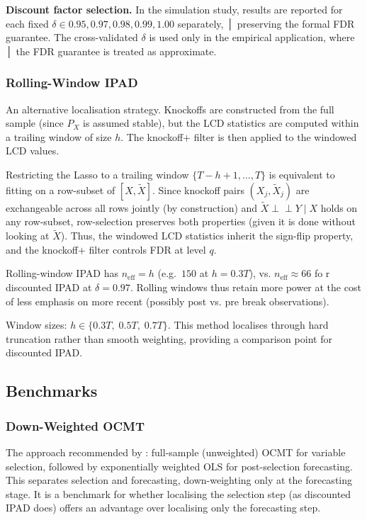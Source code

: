 \documentclass[12pt, a4paper]{article}
\begin{document}
\textbf{Discount factor selection.}  In the simulation study, results are reported for each fixed $\delta \in {0.95, 0.97, 0.98, 0.99, 1.00}$ separately,
 │ preserving the formal FDR guarantee. The cross-validated $\delta$ is used only in the empirical application, where
 │ the FDR guarantee is treated as approximate. 

 \subsubsection{Rolling-Window IPAD}
 
An alternative localisation strategy. Knockoffs are constructed from the full sample (since $P_X$ is assumed stable), but the LCD statistics are computed within a trailing window of size $h$. The knockoff$+$ filter is then applied to the windowed LCD values.

Restricting the Lasso to a trailing window $\{T-h+1, \ldots, T\}$ is equivalent to fitting on a row-subset of $[X, \tilde{X}]$. Since knockoff pairs $(X_j, \tilde{X}_j)$ are exchangeable across all rows jointly (by construction) and $\tilde{X} \perp\!\!\!\perp Y \mid X$ holds on any row-subset, row-selection preserves both properties (given it is done without looking at $\tilde{X}$). Thus, the windowed LCD statistics inherit the sign-flip property, and the knockoff$+$ filter controls FDR at level $q$.

Rolling-window IPAD has $n_{\text{eff}} = h$ (e.g.\ $150$ at $h = 0.3T$), vs. $n_{\text{eff}} \approx 66$ fo r discounted IPAD at $\delta = 0.97$. Rolling windows thus retain more power at the cost of less emphasis on more recent (possibly post vs. pre break observations).

Window sizes: $h \in \{0.3T,\; 0.5T,\; 0.7T\}$. This method localises through hard truncation rather than smooth weighting, providing a comparison point for discounted IPAD.

\subsection{Benchmarks}

\subsubsection{Down-Weighted OCMT}
 
The approach recommended by \citet{chudik2024ocmt}: full-sample (unweighted) OCMT for variable selection, followed by exponentially weighted OLS for post-selection forecasting. This separates selection and forecasting, down-weighting only at the forecasting stage. It is a benchmark for whether localising the selection step (as discounted IPAD does) offers an advantage over localising only the forecasting step.
\end{document}
